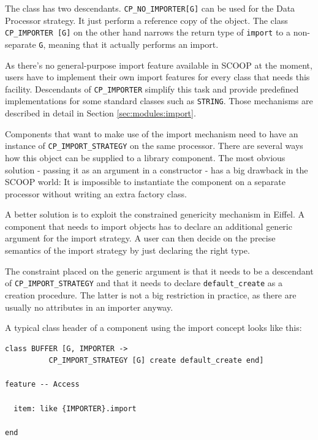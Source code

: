 \documentclass[a4paper,10pt,titlepage]{article}
\begin{document}

The class has two descendants.
\lstinline!CP_NO_IMPORTER[G]! can be used for the Data Processor strategy. 
It just perform a reference copy of the object.
The class \lstinline!CP_IMPORTER [G]! on the other hand narrows the return type of \lstinline!import! to a non-separate \lstinline!G!, meaning that it actually performs an import.

As there's no general-purpose import feature available in SCOOP at the moment, users have to implement their own import features for every class that needs this facility.
Descendants of \lstinline!CP_IMPORTER! simplify this task and provide predefined implementations for some standard classes such as \lstinline!STRING!.
Those mechanisms are described in detail in Section \ref{sec:modules:import}.

Components that want to make use of the import mechanism need to have an instance of \lstinline!CP_IMPORT_STRATEGY! on the same processor.
There are several ways how this object can be supplied to a library component.
The most obvious solution - passing it as an argument in a constructor - has a big drawback in the SCOOP world:
It is impossible to instantiate the component on a separate processor without writing an extra factory class.

A better solution is to exploit the constrained genericity mechanism in Eiffel.
A component that needs to import objects has to declare an additional generic argument for the import strategy.
A user can then decide on the precise semantics of the import strategy by just declaring the right type.

The constraint placed on the generic argument is that it needs to be a descendant of \lstinline!CP_IMPORT_STRATEGY! and that it needs to declare \lstinline!default_create! as a creation procedure.
The latter is not a big restriction in practice, as there are usually no attributes in an importer anyway.

A typical class header of a component using the import concept looks like this:
\begin{lstlisting}[language=OOSC2Eiffel, captionpos=b, caption={An example component with import.}]
class BUFFER [G, IMPORTER -> 
          CP_IMPORT_STRATEGY [G] create default_create end]

feature -- Access

  item: like {IMPORTER}.import

end
\end{lstlisting}
\end{document}
